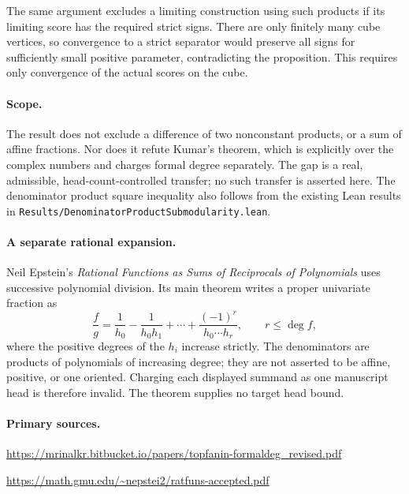 \documentclass[11pt]{article}
\begin{document}
The same argument excludes a limiting construction using such
products if its limiting score has the required strict signs.
There are only finitely many cube vertices, so convergence to a
strict separator would preserve all signs for sufficiently small
positive parameter, contradicting the proposition. This requires
only convergence of the actual scores on the cube.

\paragraph{Scope.}
The result does not exclude a difference of two nonconstant
products, or a sum of affine fractions. Nor does it refute Kumar's
theorem, which is explicitly over the complex numbers and charges
formal degree separately. The gap is a real, admissible,
head-count-controlled transfer; no such transfer is asserted here.
The denominator product square inequality also follows from the
existing Lean results in
\texttt{Results/DenominatorProductSubmodularity.lean}.

\paragraph{A separate rational expansion.}
Neil Epstein's \emph{Rational Functions as Sums of Reciprocals of
Polynomials} uses successive polynomial division. Its main theorem
writes a proper univariate fraction as
\[
 \frac{f}{g}=\frac1{h_0}-\frac1{h_0h_1}
       +\cdots+\frac{(-1)^r}{h_0\cdots h_r},
 \qquad r\le\deg f,
\]
where the positive degrees of the $h_i$ increase strictly. The
denominators are products of polynomials of increasing degree;
they are not asserted to be affine, positive, or one oriented.
Charging each displayed summand as one manuscript head is therefore
invalid. The theorem supplies no target head bound.

\paragraph{Primary sources.}
\url{https://mrinalkr.bitbucket.io/papers/topfanin-formaldeg_revised.pdf}

\url{https://math.gmu.edu/~nepstei2/ratfuns-accepted.pdf}
\end{document}

